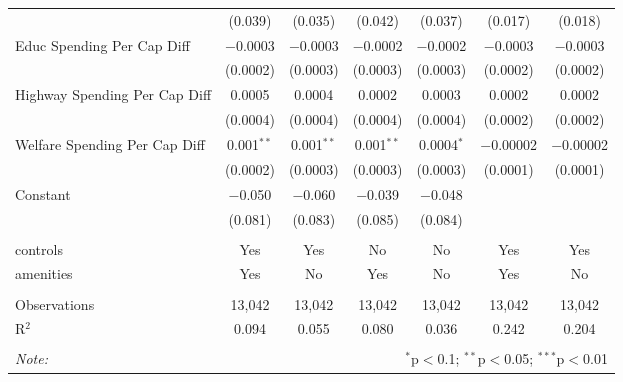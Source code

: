 \begin{table}[!htbp]
\begin{tabular}{@{\extracolsep{5pt}}lcccccc}
  & (0.039) & (0.035) & (0.042) & (0.037) & (0.017) & (0.018) \\ 
  Educ Spending Per Cap Diff & $-$0.0003 & $-$0.0003 & $-$0.0002 & $-$0.0002 & $-$0.0003 & $-$0.0003 \\ 
  & (0.0002) & (0.0003) & (0.0003) & (0.0003) & (0.0002) & (0.0002) \\ 
  Highway Spending Per Cap Diff & 0.0005 & 0.0004 & 0.0002 & 0.0003 & 0.0002 & 0.0002 \\ 
  & (0.0004) & (0.0004) & (0.0004) & (0.0004) & (0.0002) & (0.0002) \\ 
  Welfare Spending Per Cap Diff & 0.001$^{**}$ & 0.001$^{**}$ & 0.001$^{**}$ & 0.0004$^{*}$ & $-$0.00002 & $-$0.00002 \\ 
  & (0.0002) & (0.0003) & (0.0003) & (0.0003) & (0.0001) & (0.0001) \\ 
  Constant & $-$0.050 & $-$0.060 & $-$0.039 & $-$0.048 &  &  \\ 
  & (0.081) & (0.083) & (0.085) & (0.084) &  &  \\ 
 \hline \\[-1.8ex] 
controls & Yes & Yes & No & No & Yes & Yes \\ 
amenities & Yes & No & Yes & No & Yes & No \\ 
\hline \\[-1.8ex] 
Observations & 13,042 & 13,042 & 13,042 & 13,042 & 13,042 & 13,042 \\ 
R$^{2}$ & 0.094 & 0.055 & 0.080 & 0.036 & 0.242 & 0.204 \\ 
\hline 
\hline \\[-1.8ex] 
\textit{Note:}  & \multicolumn{6}{r}{$^{*}$p$<$0.1; $^{**}$p$<$0.05; $^{***}$p$<$0.01} \\ 
\end{tabular} 
\end{table} 

